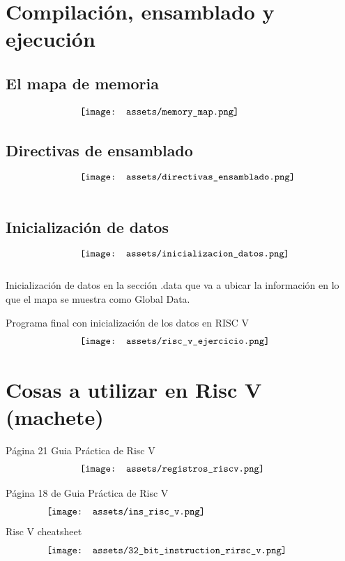 \documentclass[10pt,a4paper]{article}
\begin{document}
\section*{Compilación, ensamblado y ejecución}
\subsection*{El mapa de memoria}
\[\begin{minipage}[b]{0.6\textwidth}
    \texttt{[image: assets/memory\_map.png]}
    \label{fig:memory_map}
\end{minipage}\]
\subsection*{Directivas de ensamblado}
\[\begin{minipage}[b]{0.6\textwidth}
    \texttt{[image: assets/directivas\_ensamblado.png]}
    \label{fig:directivas_ensamblado}
\end{minipage}\]
\subsection*{Inicialización de datos}
\[\begin{minipage}[b]{0.6\textwidth}
    \texttt{[image: assets/inicializacion\_datos.png]}
    \label{fig:inicializacion_datos}
\end{minipage}\]
Inicialización de datos en la sección .data que va a ubicar la información en lo que el mapa se muestra como Global Data.

Programa final con inicialización de los datos en RISC V
\[\begin{minipage}[b]{0.6\textwidth}
    \texttt{[image: assets/risc\_v\_ejercicio.png]}
    \label{fig:risc_v_ejercicio}
\end{minipage}\]

\section*{Cosas a utilizar en Risc V (machete)}

Página 21 Guia Práctica de Risc V
\[\begin{minipage}[b]{0.6\textwidth}
    \texttt{[image: assets/registros\_riscv.png]}
    \label{fig:registros_riscv}
\end{minipage}\]

Página 18 de Guia Práctica de Risc V
\[\begin{minipage}[b]{0.8\textwidth}
    \texttt{[image: assets/ins\_risc\_v.png]}
    \label{fig:ins_risc_v}
\end{minipage}\]
Risc V cheatsheet
\[\begin{minipage}[b]{0.8\textwidth}
    \texttt{[image: assets/32\_bit\_instruction\_rirsc\_v.png]}
    \label{fig:32_bit_instruction_rirsc_v}
\end{minipage}\]
\end{document}
